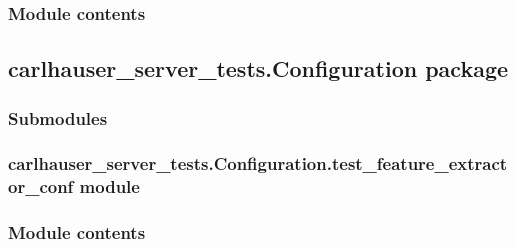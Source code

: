 \documentclass[letterpaper,10pt,english]{sphinxmanual}
\begin{document}
\begin{fulllineitems}

\begin{fulllineitems}
\label{\detokenize{carlhauser_server_tests.API:carlhauser_server_tests.API.test_in_memory_files_ops.TestInMemoryOperations.test_exif_and_hash}}
\end{fulllineitems}


\end{fulllineitems}



\subsubsection{Module contents}
\label{\detokenize{carlhauser_server_tests.API:module-carlhauser_server_tests.API}}\label{\detokenize{carlhauser_server_tests.API:module-contents}}

\subsection{carlhauser\_server\_tests.Configuration package}
\label{\detokenize{carlhauser_server_tests.Configuration:carlhauser-server-tests-configuration-package}}\label{\detokenize{carlhauser_server_tests.Configuration::doc}}

\subsubsection{Submodules}
\label{\detokenize{carlhauser_server_tests.Configuration:submodules}}

\subsubsection{carlhauser\_server\_tests.Configuration.test\_feature\_extractor\_conf module}
\label{\detokenize{carlhauser_server_tests.Configuration:carlhauser-server-tests-configuration-test-feature-extractor-conf-module}}

\subsubsection{Module contents}
\label{\detokenize{carlhauser_server_tests.Configuration:module-carlhauser_server_tests.Configuration}}\label{\detokenize{carlhauser_server_tests.Configuration:module-contents}}
\end{document}

